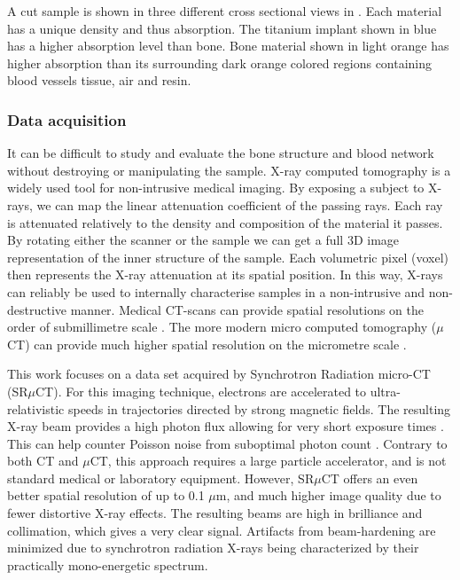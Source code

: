 \documentclass[pdflatex,sn-mathphys]{sn-jnl}%
\theoremstyle{thmstyleone}%
\theoremstyle{thmstyletwo}%
\theoremstyle{thmstylethree}%
\begin{document}
A cut sample is shown in three different cross sectional views in . Each
material has a unique density and thus absorption. The titanium implant shown in blue has a higher
absorption level than bone. Bone material shown in light orange has higher absorption than its
surrounding dark orange colored regions containing blood vessels tissue, air and resin.

\subsubsection{Data acquisition}

It can be difficult to study and evaluate the bone structure and blood network without destroying or
manipulating the sample. X-ray computed tomography is a widely used tool for non-intrusive medical
imaging. By exposing a subject to X-rays, we can map the linear attenuation coefficient of the
passing rays. Each ray is attenuated relatively to the density and composition of the material it
passes.  By rotating either the scanner or the sample we can get a full 3D image representation of
the inner structure of the sample. Each volumetric pixel (voxel) then represents the X-ray
attenuation at its spatial position. In this way, X-rays can reliably be used to internally characterise
samples in a non-intrusive and non-destructive manner. Medical CT-scans can provide spatial
resolutions on the order of submillimetre scale \citep{medicalct}. The more modern micro computed
tomography ($\mu$CT) can provide much higher spatial resolution on the micrometre scale
\citep{srexptime}.

This work focuses on a data set acquired by Synchrotron Radiation micro-CT (SR$\mu$CT). For this
imaging technique, electrons are accelerated to ultra-relativistic speeds in trajectories directed
by strong magnetic fields. The resulting X-ray beam provides a high photon flux allowing for very
short exposure times \citep{srexptime}. This can help counter Poisson noise from suboptimal photon
count \citep{srnoise}. Contrary to both CT and $\mu$CT, this approach requires a large particle
accelerator, and is not standard medical or laboratory equipment. However, SR$\mu$CT  offers an even
better spatial resolution of up to 0.1 $\mu$m, and much higher image quality due to fewer distortive
X-ray effects. The resulting beams are high in brilliance and collimation, which gives a very clear
signal. Artifacts from beam-hardening are minimized due to synchrotron radiation X-rays being
characterized by their practically mono-energetic spectrum.
\end{document}
